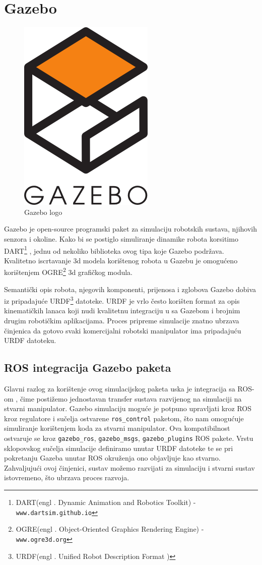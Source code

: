 \documentclass[times, utf8, diplomski, numeric]{fer}
\begin{document}
\section{Gazebo}
\begin{figure}[H]
\centering
\includegraphics[scale=0.3]{gazebo_1}
\caption{Gazebo logo}
\end{figure}
Gazebo je open-source programski paket za simulaciju robotskih sustava, njihovih senzora i okoline.
Kako bi se postiglo simuliranje dinamike robota korsitimo DART\footnote{DART(engl . Dynamic Animation and Robotics Toolkit) - \texttt{www.dartsim.github.io}} , jednu od nekoliko biblioteka ovog tipa koje Gazebo podržava.
Kvalitetno iscrtavanje 3d modela korištenog robota u Gazebu je omogućeno korištenjem OGRE\footnote{OGRE(engl . Object-Oriented Graphics Rendering Engine) - \texttt{www.ogre3d.org}} 3d grafičkog modula.

Semantički opis robota, njegovih komponenti, prijenosa i zglobova Gazebo dobiva iz pripadajuće URDF\footnote{URDF(engl . Unified Robot Description Format )} datoteke.
URDF je vrlo često korišten format za opis kinematičkih lanaca koji nudi kvalitetnu integraciju u sa Gazebom i brojnim drugim robotičkim aplikacijama.
Proces pripreme simulacije znatno ubrzava činjenica da gotovo svaki komercijalni robotski manipulator ima pripadajuću URDF datoteku.

\subsection{ROS integracija Gazebo paketa}
Glavni razlog za korištenje ovog simulacijskog paketa uska je integracija sa ROS-om , čime postižemo jednostavan transfer sustava razvijenog na simulaciji na stvarni manipulator.
Gazebo simulaciju moguće je potpuno upravljati kroz ROS kroz regulatore i sučelja ostvarene \texttt{ros\_control} paketom, što nam omogućuje simuliranje korištenjem koda za stvarni manipulator.
Ova kompatibilnost ostvaruje se kroz \texttt{gazebo\_ros}, \texttt{gazebo\_msgs}, \texttt{gazebo\_plugins}  ROS pakete.
Vrstu sklopovskog sučelja simulacije definiramo unutar URDF datoteke te se pri pokretanju Gazeba unutar ROS okruženja ono objavljuje kao stvarno.
Zahvaljujući ovoj činjenici, sustav možemo razvijati za simulaciju i stvarni sustav istovremeno, što ubrzava proces razvoja.
\end{document}
